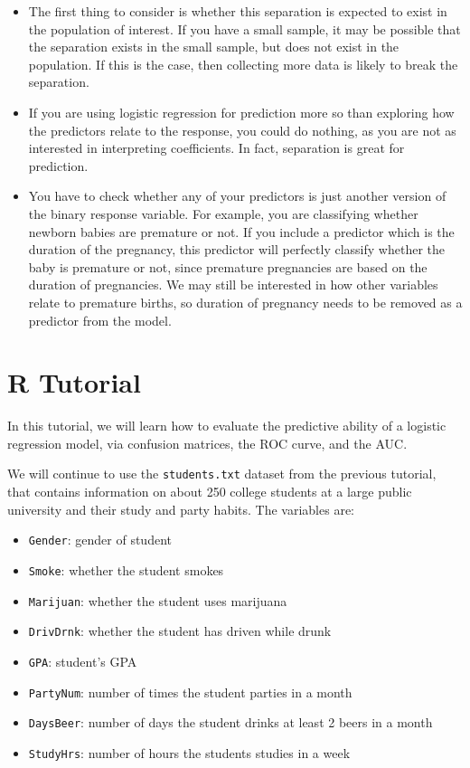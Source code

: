 \documentclass[
]{book}
\providecommand{\tightlist}{%
  \setlength{\itemsep}{0pt}\setlength{\parskip}{0pt}}
\begin{document}
\begin{itemize}
\item
  The first thing to consider is whether this separation is expected to exist in the population of interest. If you have a small sample, it may be possible that the separation exists in the small sample, but does not exist in the population. If this is the case, then collecting more data is likely to break the separation.
\item
  If you are using logistic regression for prediction more so than exploring how the predictors relate to the response, you could do nothing, as you are not as interested in interpreting coefficients. In fact, separation is great for prediction.
\item
  You have to check whether any of your predictors is just another version of the binary response variable. For example, you are classifying whether newborn babies are premature or not. If you include a predictor which is the duration of the pregnancy, this predictor will perfectly classify whether the baby is premature or not, since premature pregnancies are based on the duration of pregnancies. We may still be interested in how other variables relate to premature births, so duration of pregnancy needs to be removed as a predictor from the model.
\end{itemize}

\hypertarget{r-tutorial-9}{%
\section{R Tutorial}\label{r-tutorial-9}}

In this tutorial, we will learn how to evaluate the predictive ability of a logistic regression model, via confusion matrices, the ROC curve, and the AUC.

We will continue to use the \texttt{students.txt} dataset from the previous tutorial, that contains information on about 250 college students at a large public university and their study and party habits. The variables are:

\begin{itemize}
\tightlist
\item
  \texttt{Gender}: gender of student
\item
  \texttt{Smoke}: whether the student smokes
\item
  \texttt{Marijuan}: whether the student uses marijuana
\item
  \texttt{DrivDrnk}: whether the student has driven while drunk
\item
  \texttt{GPA}: student's GPA
\item
  \texttt{PartyNum}: number of times the student parties in a month
\item
  \texttt{DaysBeer}: number of days the student drinks at least 2 beers in a month
\item
  \texttt{StudyHrs}: number of hours the students studies in a week
\end{itemize}
\end{document}
